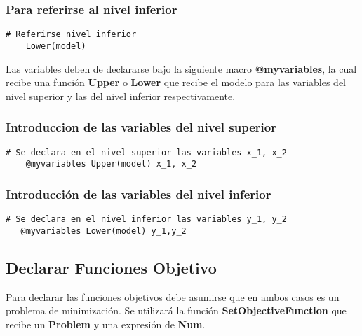 \subsubsection{Para referirse al nivel inferior}
\begin{lstlisting}[caption={Referirse al nivel inferior}]
    # Referirse nivel inferior
    Lower(model)
\end{lstlisting}


Las variables deben de 
declararse bajo la siguiente macro \textbf{@myvariables}, la cual 
recibe una función \textbf{Upper} o \textbf{Lower} que recibe el modelo
para las variables del nivel superior y las del nivel inferior respectivamente.

\subsubsection{Introduccion de  las variables del nivel superior }

\begin{lstlisting}[caption={Introducir las variables del nivel superior}]
    # Se declara en el nivel superior las variables x_1, x_2
    @myvariables Upper(model) x_1, x_2
\end{lstlisting}

\subsubsection{Introducción de las variables del nivel inferior}

\begin{lstlisting}[caption={Introducir las variables del nivel inferior}]
   # Se declara en el nivel inferior las variables y_1, y_2
   @myvariables Lower(model) y_1,y_2
\end{lstlisting}


\subsection{Declarar Funciones Objetivo}

Para declarar las funciones objetivos debe asumirse que en ambos casos es un 
problema de minimización. Se utilizará la función \textbf{SetObjectiveFunction}
que recibe un \textbf{Problem} y una expresión de \textbf{Num}.

